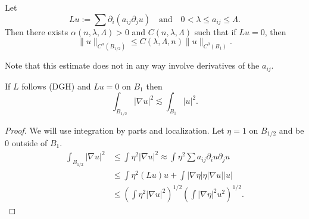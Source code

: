 \begin{theorem}
Let
\[Lu:=\sum\partial_i(a_{ij}\partial_j u)\quad\text{and}\quad0<\lambda\leq a_{ij}\leq\Lambda.\tag{DGH}\]
Then there exists $\alpha(n,\lambda,\Lambda)>0$ and $C(n,\lambda,\Lambda)$ such that if $Lu=0$, then
\[\|u\|_{C^\alpha(B_{1/2})}\leq C(\lambda,\Lambda,n)\|u\|_{C^0(B_1)}.\]
\end{theorem}
Note that this estimate does not in any way involve derivatives of the $a_{ij}$.
\begin{proposition}[1.3]
If $L$ follows (DGH) and $Lu=0$ on $B_1$ then
\[\int_{B_{1/2}}|\nabla u|^2\lesssim\int_{B_1}|u|^2.\]
\end{proposition}
\begin{proof}
We will use integration by parts and localization. Let $\eta=1$ on $B_{1/2}$ and be $0$ outside of $B_1$.
\begin{align*}
\int_{B_{1/2}}|\nabla u|^2&\leq\int\eta^2|\nabla u|^2\approx\int\eta^2\sum a_{ij}\partial_i u\partial_j u\\
&\leq\int\eta^2(Lu)u+\int|\nabla\eta|\eta|\nabla u||u|\\
&\leq\left(\int\eta^2|\nabla u|^2\right)^{1/2}\left(\int|\nabla\eta|^2u^2\right)^{1/2}.
\end{align*}
\end{proof}
